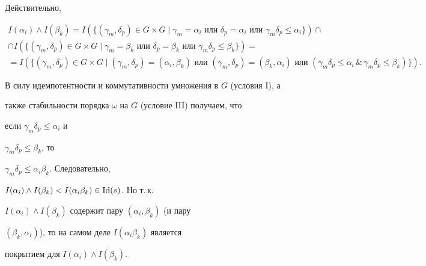 \begin{pf}


Действительно,


\begin{multline*}


I(\alpha_i)\wedge I(\beta_k)= I(\{(\gamma_m,\delta_p)\in G\times G\mid


\gamma_m=\alpha_i \text{ \ или \ }\delta_p=\alpha_i \text{ \ или \ }


\gamma_m\delta_p\leqslant\alpha_i\})\cap \\


%


\cap I(\{(\gamma_m,\delta_p)\in G\times G\mid \gamma_m=\beta_k


\text{ \ или \ }\delta_p=\beta_k \text{ \ или \ }


\gamma_m\delta_p\leqslant\beta_k\})= \\


%


=I(\{(\gamma_m,\delta_p)\in G\times G\mid


(\gamma_m,\delta_p)=(\alpha_i,\beta_k) \text{ \ или \ }


(\gamma_m,\delta_p)=(\beta_k,\alpha_i) \text{ \ или \ }


(\gamma_m\delta_p\leqslant\alpha_i \,\&\,


\gamma_m\delta_p\leqslant\beta_k)\}).


\end{multline*}


В силу идемпотентности и коммутативности умножения в $G$ (условия I), а


также стабильности порядка $\omega$ на $G$ (условие III) получаем, что


если $\gamma_m\delta_p\leqslant\alpha_i$ и


$\gamma_m\delta_p\leqslant\beta_k$, то


$\gamma_m\delta_p\leqslant\alpha_i\beta_k$. Следовательно,


$I(\alpha_i)\wedge I(\beta_k)<I(\alpha_i\beta_k)\in \operatorname{Id}(s)$. Но т.\,к.


$I(\alpha_i)\wedge I(\beta_k)$ содержит пару $(\alpha_i,\beta_k)$ (и пару


$(\beta_k,\alpha_i)$), то на самом деле $I(\alpha_i\beta_k)$ является


покрытием для $I(\alpha_i)\wedge I(\beta_k)$.


\end{pf}





